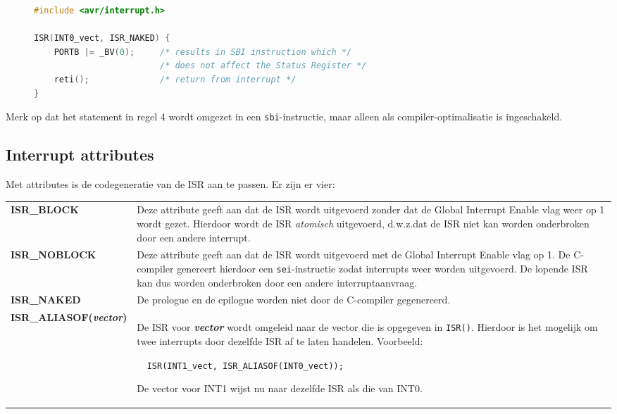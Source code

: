 \begin{figure}[!ht]
\begin{lstlisting}[language=C,caption=Een naked interrupt voor INT0.,label=cod:intnakedisr]
#include <avr/interrupt.h>

ISR(INT0_vect, ISR_NAKED) {
	PORTB |= _BV(0);     /* results in SBI instruction which */
	                     /* does not affect the Status Register */
	reti();              /* return from interrupt */
}
\end{lstlisting}
\end{figure}

Merk op dat het statement in regel 4 wordt omgezet in een
\lstinline|sbi|-instructie, maar alleen als compiler-optimalisatie
is ingeschakeld.

\subsection{Interrupt attributes}
Met attributes is de codegeneratie van de ISR aan te passen. Er zijn er vier:

\renewcommand*{\arraystretch}{1.5}
\begin{longtable}[!ht]{@{}lp{10.5cm}}
\textbf{ISR\_BLOCK} & Deze attribute geeft aan dat de ISR wordt uitgevoerd zonder dat de Global Interrupt Enable vlag weer op 1 wordt gezet. Hierdoor wordt de ISR \textsl{atomisch} uitgevoerd, d.w.z.\@ dat de ISR niet kan worden onderbroken door een andere interrupt.\\
\textbf{ISR\_NOBLOCK} & Deze attribute geeft aan dat de ISR wordt uitgevoerd met de Global Interrupt Enable vlag op 1. De C-compiler genereert hierdoor een \lstinline|sei|-instructie zodat interrupts weer worden uitgevoerd. De lopende ISR kan dus worden onderbroken door een andere interruptaanvraag.\\
\textbf{ISR\_NAKED} & De prologue en de epilogue worden niet door de C-compiler gegenereerd.\\
\textbf{ISR\_ALIASOF(\textsl{vector})} & De ISR voor \textbf{\textsl{vector}} wordt omgeleid naar de vector die is opgegeven in \lstinline|ISR()|. Hierdoor is het mogelijk om twee interrupts door dezelfde ISR af te laten handelen. Voorbeeld:\vspace*{.5\baselineskip}

\lstinline|  ISR(INT1_vect, ISR_ALIASOF(INT0_vect));|\vspace*{.5\baselineskip}

De vector voor INT1 wijst nu naar dezelfde ISR als die van INT0.\\
\end{longtable}
\renewcommand*{\arraystretch}{1.0}

